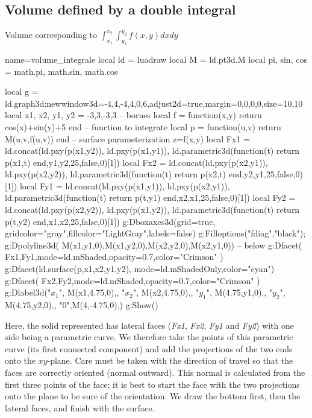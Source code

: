 \subsection{Volume defined by a double integral}
\begin{demo}{Volume corresponding to $\int_{x_1}^{x_2}\int_{y_1}^{y_2}f(x,y)dxdy$}
\begin{luadraw}{name=volume_integrale}
local ld = luadraw
local M = ld.pt3d.M
local pi, sin, cos = math.pi, math.sin, math.cos

local g = ld.graph3d:new{window3d={-4,4,-4,4,0,6},adjust2d=true,margin={0,0,0,0},size={10,10}}
local x1, x2, y1, y2 = -3,3,-3,3 -- bornes
local f = function(x,y) return cos(x)+sin(y)+5 end -- function to integrate
local p = function(u,v) return M(u,v,f(u,v)) end -- surface parameterization z=f(x,y)
local Fx1 = ld.concat({ld.pxy(p(x1,y2)), ld.pxy(p(x1,y1))}, ld.parametric3d(function(t) return p(x1,t) end,y1,y2,25,false,0)[1])
local Fx2 = ld.concat({ld.pxy(p(x2,y1)), ld.pxy(p(x2,y2))}, ld.parametric3d(function(t) return p(x2,t) end,y2,y1,25,false,0)[1])
local Fy1 = ld.concat({ld.pxy(p(x1,y1)), ld.pxy(p(x2,y1))}, ld.parametric3d(function(t) return p(t,y1) end,x2,x1,25,false,0)[1])
local Fy2 = ld.concat({ld.pxy(p(x2,y2)), ld.pxy(p(x1,y2))}, ld.parametric3d(function(t) return p(t,y2) end,x1,x2,25,false,0)[1])
g:Dboxaxes3d({grid=true, gridcolor="gray",fillcolor="LightGray",labels=false})
g:Filloptions("fdiag","black"); g:Dpolyline3d( {M(x1,y1,0),M(x1,y2,0),M(x2,y2,0),M(x2,y1,0)}) -- below
g:Dfacet( {Fx1,Fy1},{mode=ld.mShaded,opacity=0.7,color="Crimson"} )
g:Dfacet(ld.surface(p,x1,x2,y1,y2), {mode=ld.mShadedOnly,color="cyan"})
g:Dfacet( {Fx2,Fy2},{mode=ld.mShaded,opacity=0.7,color="Crimson"} )
g:Dlabel3d("$x_1$", M(x1,4.75,0),{}, "$x_2$", M(x2,4.75,0),{},
"$y_1$", M(4.75,y1,0),{}, "$y_2$", M(4.75,y2,0),{}, "$0$",M(4,-4.75,0),{})
g:Show()
\end{luadraw}
\end{demo}

Here, the solid represented has lateral faces (\emph{Fx1}, \emph{Fx2}, \emph{Fy1} and \emph{Fy2})  with one side being a parametric curve. We therefore take the points of this parametric curve (its first connected component) and add the projections of the two ends onto the $xy$-plane. Care must be taken with the direction of travel so that the faces are correctly oriented (normal outward). This normal is calculated from the first three points of the face; it is best to start the face with the two projections onto the plane to be sure of the orientation.
We draw the bottom first, then the lateral faces, and finish with the surface.

